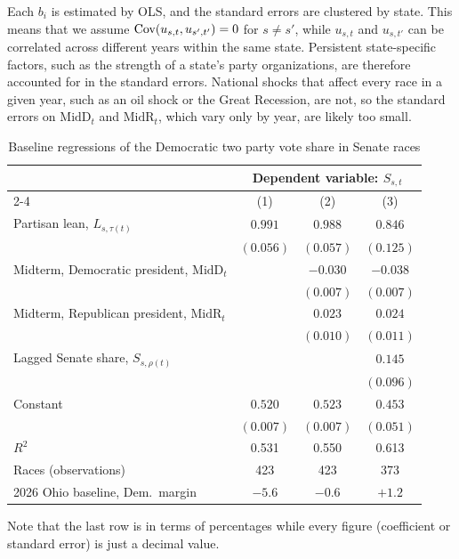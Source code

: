 \documentclass{article}
\newcommand{\Cov}{\textnormal{Cov}}
\theoremstyle{definition}
\begin{document}
Each $b_i$ is estimated by OLS, and the standard errors are clustered by state. This means that we assume $\Cov(u_{s,t}, u_{s',t'}) = 0$ for $s \neq s'$, while $u_{s,t}$ and $u_{s,t'}$ can be correlated across different years within the same state. Persistent state-specific factors, such as the strength of a state's party organizations, are therefore accounted for in the standard errors. National shocks that affect every race in a given year, such as an oil shock or the Great Recession, are not, so the standard errors on $\text{MidD}_t$ and $\text{MidR}_t$, which vary only by year, are likely too small.



\begin{table}[!htbp]
  \centering
  \footnotesize
  \setlength{\tabcolsep}{4pt}
  \caption{Baseline regressions of the Democratic two party vote share in Senate races}
  \label{tab:baseline}
  \begin{tabular}{l*{3}{c}}
    \toprule
    & \multicolumn{3}{c}{Dependent variable: $S_{s,t}$} \\
    \cmidrule(lr){2-4}
    & (1) & (2) & (3) \\
    \midrule
    Partisan lean, $L_{s,\tau(t)}$ & $0.991$ & $0.988$ & $0.846$ \\
     & $(0.056)$ & $(0.057)$ & $(0.125)$ \\[1pt]
    Midterm, Democratic president, $\text{MidD}_t$ &  & $-0.030$ & $-0.038$ \\
     &  & $(0.007)$ & $(0.007)$ \\[1pt]
    Midterm, Republican president, $\text{MidR}_t$ &  & $0.023$ & $0.024$ \\
     &  & $(0.010)$ & $(0.011)$ \\[1pt]
    Lagged Senate share, $S_{s,\rho(t)}$ &  &  & $0.145$ \\
     &  &  & $(0.096)$ \\[1pt]
    Constant & $0.520$ & $0.523$ & $0.453$ \\
     & $(0.007)$ & $(0.007)$ & $(0.051)$ \\[1pt]
    \midrule
    $R^2$ & 0.531 & 0.550 & 0.613 \\
    Races (observations) & 423 & 423 & 373 \\
    \midrule
    2026 Ohio baseline, Dem.\ margin & $-5.6$ & $-0.6$ & $+1.2$ \\
    \bottomrule
  \end{tabular}
\end{table}
Note that the last row is in terms of percentages while every figure (coefficient or standard error) is just a decimal value. 
\end{document}
